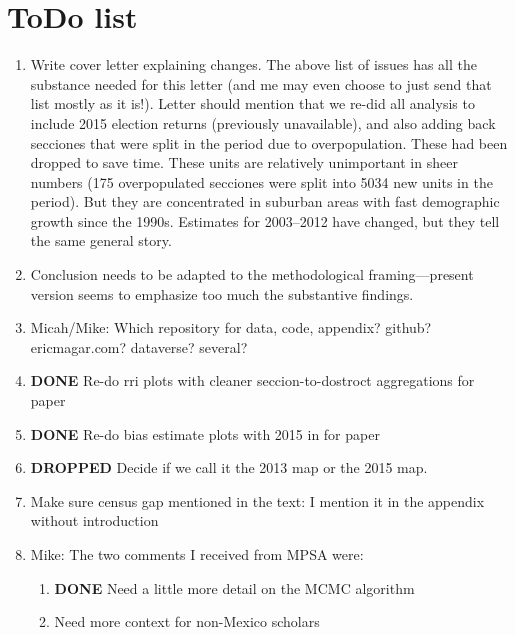 \documentclass{article}
\begin{document}
\section{ToDo list}
\label{sec:orgheadline41}
\begin{enumerate}
\item Write cover letter explaining changes. The above list of issues has all the substance needed for this letter (and me may even choose to just send that list mostly as it is!). Letter should mention that we re-did all analysis to include 2015 election returns (previously unavailable), and also adding back secciones that were split in the period due to overpopulation. These had been dropped to save time. These units are relatively unimportant in sheer numbers (175 overpopulated secciones were split into 5034 new units in the period). But they are concentrated in suburban areas with fast demographic growth since the 1990s. Estimates for 2003--2012 have changed, but they tell the same general story.
\label{sec:orgheadline31}
\item Conclusion needs to be adapted to the methodological framing---present version seems to emphasize too much the substantive findings.
\label{sec:orgheadline32}
\item Micah/Mike: Which repository for data, code, appendix? github? ericmagar.com? dataverse? several?
\label{sec:orgheadline33}
\item {\bfseries\sffamily DONE} Re-do rri plots with cleaner seccion-to-dostroct aggregations for paper
\label{sec:orgheadline34}
\item {\bfseries\sffamily DONE} Re-do bias estimate plots with 2015 in for paper
\label{sec:orgheadline35}
\item {\bfseries\sffamily DROPPED} Decide if we call it the 2013 map or the 2015 map.
\label{sec:orgheadline36}
\item Make sure census gap mentioned in the text: I mention it in the appendix without introduction
\label{sec:orgheadline37}
\item Mike: The two comments I received from MPSA were:
\label{sec:orgheadline40}
\begin{enumerate}
\item {\bfseries\sffamily DONE} Need a little more detail on the MCMC algorithm
\label{sec:orgheadline38}
\item Need more context for non-Mexico scholars
\label{sec:orgheadline39}
\end{enumerate}
\end{enumerate}
\end{document}

